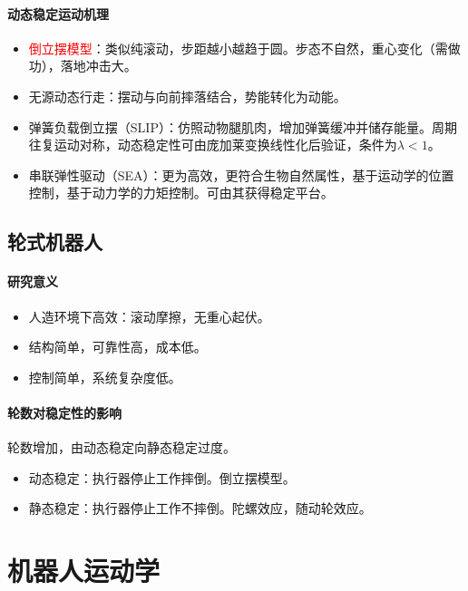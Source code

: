 \documentclass[
12pt, %
a4paper, 
oneside, %
]{scrartcl}
\begin{document}
\paragraph{动态稳定运动机理}
\begin{itemize}
\item \textcolor{red}{倒立摆模型}：类似纯滚动，步距越小越趋于圆。步态不自然，重心变化（需做功），落地冲击大。
\item 无源动态行走：摆动与向前摔落结合，势能转化为动能。
\item 弹簧负载倒立摆（SLIP）：仿照动物腿肌肉，增加弹簧缓冲并储存能量。周期往复运动对称，动态稳定性可由庞加莱变换线性化后验证，条件为$ \lambda < 1 $。
\item 串联弹性驱动（SEA）：更为高效，更符合生物自然属性，基于运动学的位置控制，基于动力学的力矩控制。可由其获得稳定平台。
\end{itemize}
\subsection[轮式机器人]{轮式机器人}
\paragraph{研究意义}
\begin{itemize}
\item 人造环境下高效：滚动摩擦，无重心起伏。
\item 结构简单，可靠性高，成本低。
\item 控制简单，系统复杂度低。
\end{itemize}
\paragraph{轮数对稳定性的影响}
轮数增加，由动态稳定向静态稳定过度。
\begin{itemize}
\item 动态稳定：执行器停止工作摔倒。倒立摆模型。    
\item 静态稳定：执行器停止工作不摔倒。陀螺效应，随动轮效应。
\end{itemize}
\section{机器人运动学}
\end{document}
